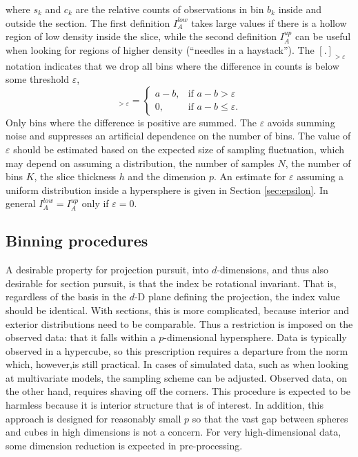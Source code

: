 \documentclass[]{interact}
\theoremstyle{plain}%
\theoremstyle{definition}
\theoremstyle{remark}
\begin{document}
\noindent where \(s_{k}\) and \(c_{k}\) are the relative counts of
observations in bin \(b_{k}\) inside and outside the section. The first
definition \(I_A^{low}\) takes large values if there is a hollow region
of low density inside the slice, while the second definition
\(I_A^{up}\) can be useful when looking for regions of higher density
(``needles in a haystack''). The \([.]_{>\varepsilon}\) notation
indicates that we drop all bins where the difference in counts is below
some threshold \(\varepsilon\), \begin{equation}
[a - b]_{>\varepsilon} = \begin{cases}
    a - b, & \text{if $a - b > \varepsilon$}\\
    0, & \text{if $a-b \leq \varepsilon$.}
  \end{cases}
\end{equation} Only bins where the difference is positive are summed.
The \(\varepsilon\) avoids summing noise and suppresses an artificial
dependence on the number of bins. The value of \(\varepsilon\) should be
estimated based on the expected size of sampling fluctuation, which may
depend on assuming a distribution, the number of samples \(N\), the
number of bins \(K\), the slice thickness \(h\) and the dimension \(p\).
An estimate for \(\varepsilon\) assuming a uniform distribution inside a
hypersphere is given in Section \ref{sec:epsilon}. In general
\(I_A^{low}=I_A^{up}\) only if \(\varepsilon=0\).

\hypertarget{binning-procedures}{%
\subsection{Binning procedures}\label{binning-procedures}}

A desirable property for projection pursuit, into \(d\)-dimensions, and
thus also desirable for section pursuit, is that the index be rotational
invariant. That is, regardless of the basis in the \(d\)-D plane
defining the projection, the index value should be identical. With
sections, this is more complicated, because interior and exterior
distributions need to be comparable. Thus a restriction is imposed on
the observed data: that it falls within a \(p\)-dimensional hypersphere.
Data is typically observed in a hypercube, so this prescription requires
a departure from the norm which, however,is still practical. In cases of
simulated data, such as when looking at multivariate models, the
sampling scheme can be adjusted. Observed data, on the other hand,
requires shaving off the corners. This procedure is expected to be
harmless because it is interior structure that is of interest. In
addition, this approach is designed for reasonably small \(p\) so that
the vast gap between spheres and cubes in high dimensions is not a
concern. For very high-dimensional data, some dimension reduction is
expected in pre-processing.
\end{document}
